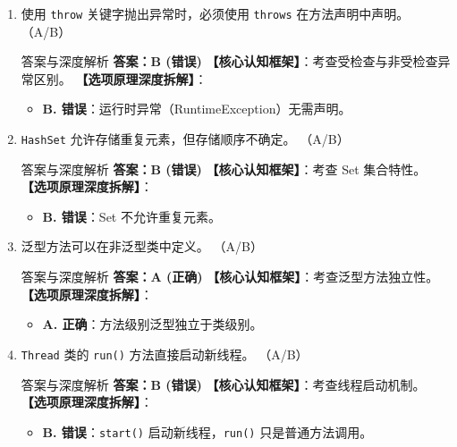 ﻿\documentclass[12pt, a4paper]{ctexart}
\newcommand{\code}[1]{\texttt{#1}}
\begin{document}
\begin{enumerate}[label=\arabic*., itemsep=1.5em]
	\item 使用 \code{throw} 关键字抛出异常时，必须使用 \code{throws} 在方法声明中声明。 \underline{\hspace{1cm}}（A/B）
	      \begin{bluebox}{答案与深度解析}
		      \textbf{答案：B (错误)}
		      \textbf{【核心认知框架】}：考查受检查与非受检查异常区别。
		      \textbf{【选项原理深度拆解】}：
		      \begin{itemize}[leftmargin=*, nosep]
			      \item \textbf{B. 错误}：运行时异常（RuntimeException）无需声明。
		      \end{itemize}
	      \end{bluebox}

	\item \code{HashSet} 允许存储重复元素，但存储顺序不确定。 \underline{\hspace{1cm}}（A/B）
	      \begin{bluebox}{答案与深度解析}
		      \textbf{答案：B (错误)}
		      \textbf{【核心认知框架】}：考查 Set 集合特性。
		      \textbf{【选项原理深度拆解】}：
		      \begin{itemize}[leftmargin=*, nosep]
			      \item \textbf{B. 错误}：Set 不允许重复元素。
		      \end{itemize}
	      \end{bluebox}

	\item 泛型方法可以在非泛型类中定义。 \underline{\hspace{1cm}}（A/B）
	      \begin{bluebox}{答案与深度解析}
		      \textbf{答案：A (正确)}
		      \textbf{【核心认知框架】}：考查泛型方法独立性。
		      \textbf{【选项原理深度拆解】}：
		      \begin{itemize}[leftmargin=*, nosep]
			      \item \textbf{A. 正确}：方法级别泛型独立于类级别。
		      \end{itemize}
	      \end{bluebox}

	\item \code{Thread} 类的 \code{run()} 方法直接启动新线程。 \underline{\hspace{1cm}}（A/B）
	      \begin{bluebox}{答案与深度解析}
		      \textbf{答案：B (错误)}
		      \textbf{【核心认知框架】}：考查线程启动机制。
		      \textbf{【选项原理深度拆解】}：
		      \begin{itemize}[leftmargin=*, nosep]
			      \item \textbf{B. 错误}：\code{start()} 启动新线程，\code{run()} 只是普通方法调用。
		      \end{itemize}
	      \end{bluebox}


\end{enumerate}
\end{document}
